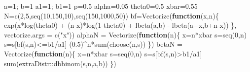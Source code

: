 \documentclass[
]{book}
\newenvironment{Shaded}{\begin{snugshade}}{\end{snugshade}}
\newcommand{\AttributeTok}[1]{\textcolor[rgb]{0.77,0.63,0.00}{#1}}
\newcommand{\ControlFlowTok}[1]{\textcolor[rgb]{0.13,0.29,0.53}{\textbf{#1}}}
\newcommand{\DecValTok}[1]{\textcolor[rgb]{0.00,0.00,0.81}{#1}}
\newcommand{\FloatTok}[1]{\textcolor[rgb]{0.00,0.00,0.81}{#1}}
\newcommand{\FunctionTok}[1]{\textcolor[rgb]{0.00,0.00,0.00}{#1}}
\newcommand{\NormalTok}[1]{#1}
\newcommand{\OtherTok}[1]{\textcolor[rgb]{0.56,0.35,0.01}{#1}}
\newcommand{\SpecialCharTok}[1]{\textcolor[rgb]{0.00,0.00,0.00}{#1}}
\newcommand{\StringTok}[1]{\textcolor[rgb]{0.31,0.60,0.02}{#1}}
\begin{document}
\begin{Shaded}
\begin{Highlighting}[]
\NormalTok{a}\OtherTok{=}\DecValTok{1}\NormalTok{; b}\OtherTok{=}\DecValTok{1}
\NormalTok{a1}\OtherTok{=}\DecValTok{1}\NormalTok{; b1}\OtherTok{=}\DecValTok{1}
\NormalTok{p}\OtherTok{=}\FloatTok{0.5}
\NormalTok{alpha}\OtherTok{=}\FloatTok{0.05}
\NormalTok{theta0}\OtherTok{=}\FloatTok{0.5}
\NormalTok{xbar}\OtherTok{=}\FloatTok{0.55}
\NormalTok{N}\OtherTok{=}\FunctionTok{c}\NormalTok{(}\DecValTok{2}\NormalTok{,}\DecValTok{5}\NormalTok{,}\FunctionTok{seq}\NormalTok{(}\DecValTok{10}\NormalTok{,}\DecValTok{150}\NormalTok{,}\DecValTok{10}\NormalTok{),}\FunctionTok{seq}\NormalTok{(}\DecValTok{150}\NormalTok{,}\DecValTok{1000}\NormalTok{,}\DecValTok{50}\NormalTok{))}
\NormalTok{bf}\OtherTok{=}\FunctionTok{Vectorize}\NormalTok{(}\ControlFlowTok{function}\NormalTok{(x,n)\{}
  \FunctionTok{exp}\NormalTok{(x}\SpecialCharTok{*}\FunctionTok{log}\NormalTok{(theta0) }\SpecialCharTok{+}\NormalTok{ (n}\SpecialCharTok{{-}}\NormalTok{x)}\SpecialCharTok{*}\FunctionTok{log}\NormalTok{(}\DecValTok{1}\SpecialCharTok{{-}}\NormalTok{theta0) }\SpecialCharTok{+} \FunctionTok{lbeta}\NormalTok{(a,b) }\SpecialCharTok{{-}} \FunctionTok{lbeta}\NormalTok{(a}\SpecialCharTok{+}\NormalTok{x,b}\SpecialCharTok{+}\NormalTok{n}\SpecialCharTok{{-}}\NormalTok{x))}
\NormalTok{\}, }\AttributeTok{vectorize.args =} \FunctionTok{c}\NormalTok{(}\StringTok{"x"}\NormalTok{))}
\NormalTok{alphaN }\OtherTok{=} \FunctionTok{Vectorize}\NormalTok{(}\ControlFlowTok{function}\NormalTok{(n)\{}
\NormalTok{  x}\OtherTok{=}\NormalTok{n}\SpecialCharTok{*}\NormalTok{xbar}
\NormalTok{  s}\OtherTok{=}\FunctionTok{seq}\NormalTok{(}\DecValTok{0}\NormalTok{,n)}
\NormalTok{  s}\OtherTok{=}\NormalTok{s[}\FunctionTok{bf}\NormalTok{(s,n)}\SpecialCharTok{\textless{}=}\NormalTok{b1}\SpecialCharTok{/}\NormalTok{a1]}
\NormalTok{  (}\FloatTok{0.5}\NormalTok{)}\SpecialCharTok{\^{}}\NormalTok{n}\SpecialCharTok{*}\FunctionTok{sum}\NormalTok{(}\FunctionTok{choose}\NormalTok{(n,s))}
\NormalTok{\})}
\NormalTok{betaN }\OtherTok{=} \FunctionTok{Vectorize}\NormalTok{(}\ControlFlowTok{function}\NormalTok{(n)\{}
\NormalTok{  x}\OtherTok{=}\NormalTok{n}\SpecialCharTok{*}\NormalTok{xbar}
\NormalTok{  s}\OtherTok{=}\FunctionTok{seq}\NormalTok{(}\DecValTok{0}\NormalTok{,n)}
\NormalTok{  s}\OtherTok{=}\NormalTok{s[}\FunctionTok{bf}\NormalTok{(s,n)}\SpecialCharTok{\textgreater{}}\NormalTok{b1}\SpecialCharTok{/}\NormalTok{a1]}
  \FunctionTok{sum}\NormalTok{(extraDistr}\SpecialCharTok{::}\FunctionTok{dbbinom}\NormalTok{(s,n,a,b))}
\NormalTok{\})}

\end{Highlighting}
\end{Shaded}
\end{document}
